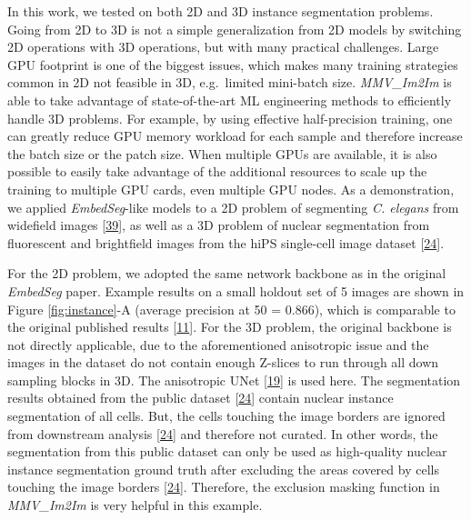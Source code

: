 In this work, we tested on both 2D and 3D instance segmentation problems. Going from 2D to 3D is not a simple generalization from 2D models by switching 2D operations with 3D operations, but with many practical challenges. Large GPU footprint is one of the biggest issues, which makes many training strategies common in 2D not feasible in 3D, e.g.~limited mini-batch size. \emph{MMV\_Im2Im} is able to take advantage of state-of-the-art ML engineering methods to efficiently handle 3D problems. For example, by using effective half-precision training, one can greatly reduce GPU memory workload for each sample and therefore increase the batch size or the patch size. When multiple GPUs are available, it is also possible to easily take advantage of the additional resources to scale up the training to multiple GPU cards, even multiple GPU nodes. As a demonstration, we applied \emph{EmbedSeg}-like models to a 2D problem of segmenting \emph{C. elegans} from widefield images {[}\protect\hyperlink{ref-138foKNOh}{39}{]}, as well as a 3D problem of nuclear segmentation from fluorescent and brightfield images from the hiPS single-cell image dataset {[}\protect\hyperlink{ref-5sGcmDuy}{24}{]}.

For the 2D problem, we adopted the same network backbone as in the original \emph{EmbedSeg} paper. Example results on a small holdout set of 5 images are shown in Figure \ref{fig:instance}-A (average precision at 50 = 0.866), which is comparable to the original published results {[}\protect\hyperlink{ref-QmYuUQ5K}{11}{]}. For the 3D problem, the original backbone is not directly applicable, due to the aforementioned anisotropic issue and the images in the dataset do not contain enough Z-slices to run through all down sampling blocks in 3D. The anisotropic UNet {[}\protect\hyperlink{ref-jM3v1UjQ}{19}{]} is used here. The segmentation results obtained from the public dataset {[}\protect\hyperlink{ref-5sGcmDuy}{24}{]} contain nuclear instance segmentation of all cells. But, the cells touching the image borders are ignored from downstream analysis {[}\protect\hyperlink{ref-5sGcmDuy}{24}{]} and therefore not curated. In other words, the segmentation from this public dataset can only be used as high-quality nuclear instance segmentation ground truth after excluding the areas covered by cells touching the image borders {[}\protect\hyperlink{ref-5sGcmDuy}{24}{]}. Therefore, the exclusion masking function in \emph{MMV\_Im2Im} is very helpful in this example.

